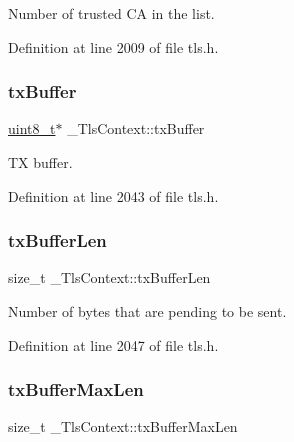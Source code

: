 Number of trusted CA in the list. 



Definition at line 2009 of file tls.\+h.

\mbox{\label{struct__TlsContext_a0e04e2758829e37fb894b00633c3fe35}} 
\subsubsection{\texorpdfstring{tx\+Buffer}{txBuffer}}
{\footnotesize\ttfamily \hyperlink{stdint_8h_aba7bc1797add20fe3efdf37ced1182c5}{uint8\+\_\+t}$\ast$ \+\_\+\+Tls\+Context\+::tx\+Buffer}



TX buffer. 



Definition at line 2043 of file tls.\+h.

\mbox{\label{struct__TlsContext_aafc38bc91b63426ce3756839aeebfea1}} 
\subsubsection{\texorpdfstring{tx\+Buffer\+Len}{txBufferLen}}
{\footnotesize\ttfamily size\+\_\+t \+\_\+\+Tls\+Context\+::tx\+Buffer\+Len}



Number of bytes that are pending to be sent. 



Definition at line 2047 of file tls.\+h.

\mbox{\label{struct__TlsContext_a6353b7de22268d3c37f4d7898e151a54}} 
\subsubsection{\texorpdfstring{tx\+Buffer\+Max\+Len}{txBufferMaxLen}}
{\footnotesize\ttfamily size\+\_\+t \+\_\+\+Tls\+Context\+::tx\+Buffer\+Max\+Len}



